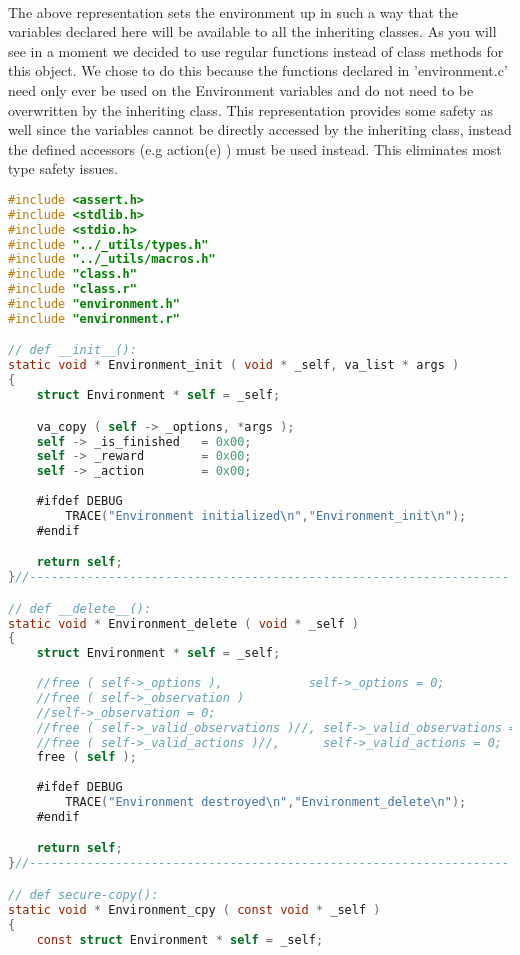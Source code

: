 \documentclass[fancychapters]{report}   	%
\begin{document}
\paragraph{} The above representation sets the environment up in such a way that the variables declared here will be available to all the inheriting classes.  As you will see in a moment we decided to use regular functions instead of class methods for this object.  We chose to do this because the functions declared in 'environment.c' need only ever be used on the Environment variables and do not need to be overwritten by the inheriting class.  This representation provides some safety as well since the variables cannot be directly accessed by the inheriting class, instead the defined accessors (e.g action(e) ) must be used instead. This eliminates most type safety issues.
\begin{lstlisting}[language=C,caption={environment.c}]
#include <assert.h>
#include <stdlib.h>
#include <stdio.h>
#include "../_utils/types.h"
#include "../_utils/macros.h"
#include "class.h"
#include "class.r"
#include "environment.h"
#include "environment.r"

// def __init__():
static void * Environment_init ( void * _self, va_list * args )
{
    struct Environment * self = _self;

    va_copy ( self -> _options, *args );
    self -> _is_finished   = 0x00;
    self -> _reward        = 0x00;
    self -> _action        = 0x00;
    
    #ifdef DEBUG 
        TRACE("Environment initialized\n","Environment_init\n");
    #endif

    return self;
}//-------------------------------------------------------------------

// def __delete__():
static void * Environment_delete ( void * _self )
{
    struct Environment * self = _self;
    
    //free ( self->_options ),            self->_options = 0;
    //free ( self->_observation )
    //self->_observation = 0;
    //free ( self->_valid_observations )//, self->_valid_observations = 0;
    //free ( self->_valid_actions )//,      self->_valid_actions = 0;
    free ( self );
    
    #ifdef DEBUG 
        TRACE("Environment destroyed\n","Environment_delete\n");
    #endif

    return self;
}//-------------------------------------------------------------------

// def secure-copy():
static void * Environment_cpy ( const void * _self )
{
    const struct Environment * self = _self;


\end{lstlisting}
\end{document}
